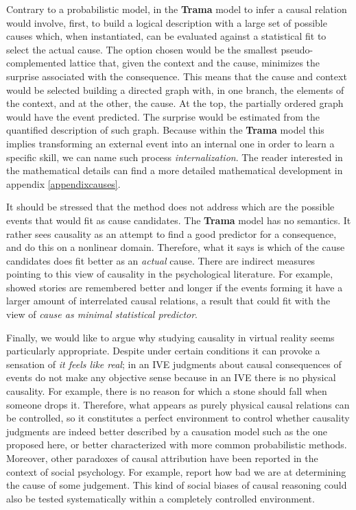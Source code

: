 \documentclass[
		twoside,openright,titlepage,numbers=noenddot,manychapters,
		headinclude,%
                footinclude=false,cleardoublepage=empty,
                BCOR=5mm,
		fontsize=11pt, %
                 enabledeprecatedfontcommands]{scrreprt}
\begin{document}
Contrary to a probabilistic model, in the \textbf{Trama} model to infer a causal relation would involve, first, to build a logical description with a large set of possible causes which, when instantiated, can be evaluated against a statistical fit to select the actual cause. The option chosen would be the smallest pseudo-complemented lattice that, given the context and the cause, minimizes the surprise associated with the consequence. This means that the cause and context would be selected building a directed graph with, in one branch, the elements of the context, and at the other, the cause. At the top, the partially ordered graph would have the event predicted. The surprise would be estimated from the quantified description of such graph. Because within the \textbf{Trama} model this implies transforming an external event into an internal one in order to learn a specific skill, we can name such process \emph{internalization}. The reader interested in the mathematical details can find a more detailed mathematical development in appendix \ref{appendixcauses}.

It should be stressed that the method does not address which are the possible events that would fit as cause candidates. The \textbf{Trama} model has no semantics. It rather sees causality as an attempt to find a good predictor for a consequence, and do this on a nonlinear domain. Therefore, what it says is which of the cause candidates does fit better as an \emph{actual} cause.  There are indirect measures pointing to this view of causality in the psychological literature. For example, \cite{trabasso1982cca} showed stories are remembered better and longer if the events forming it have a larger amount of interrelated causal relations, a result that could fit with the view of \emph{cause as minimal statistical predictor}. 

Finally, we would like to argue why studying causality in virtual reality seems particularly appropriate. Despite under certain conditions it can provoke a sensation of \emph{it feels like real}; in an IVE judgments about causal consequences of events do not make any objective sense because in an IVE there is no physical causality. For example, there is no reason for which a stone should fall when someone drops it. Therefore, what appears as purely physical causal relations can be controlled, so it constitutes a perfect environment to control whether causality judgments are indeed better described by a causation model such as the one proposed here, or better characterized with more common probabilistic methods.
Moreover, other paradoxes of causal attribution have been reported in the context of social psychology. For example,  \cite{nisbett1977telling} report how bad we are at determining the cause of some judgement. This kind of social biases of causal reasoning could also be tested systematically within a completely controlled environment.
\end{document}
